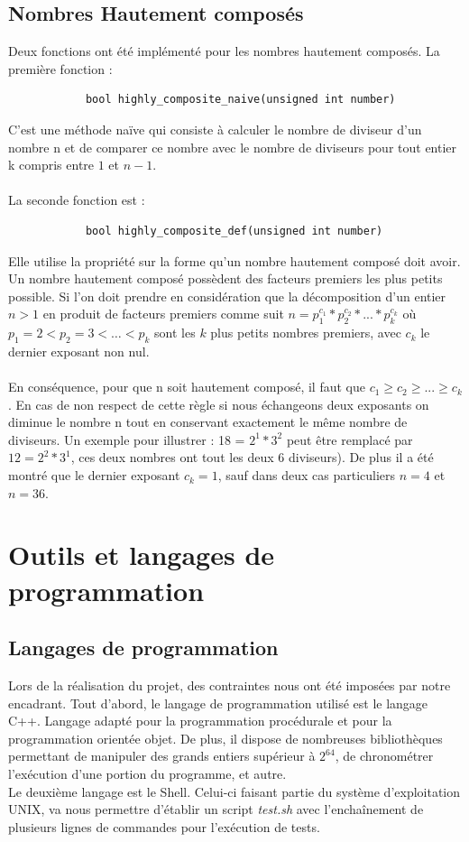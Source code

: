 		\subsection{Nombres Hautement composés}
		Deux fonctions ont été implémenté pour les nombres hautement composés. La première fonction : 				\begin{lstlisting}
			bool highly_composite_naive(unsigned int number)
		\end{lstlisting}
		C'est une méthode naïve qui consiste à calculer le nombre de diviseur d'un nombre n et de comparer ce nombre avec le nombre de diviseurs pour tout entier k compris entre $1$ et $n-1$.
		\paragraph{}La seconde fonction est :
		\begin{lstlisting}
			bool highly_composite_def(unsigned int number)
		\end{lstlisting}
		Elle utilise la propriété sur la forme qu'un nombre hautement composé doit avoir. Un nombre hautement composé possèdent des facteurs premiers les plus petits possible. Si l'on doit prendre en considération que la décomposition d'un entier $n > 1$ en produit de facteurs premiers comme suit  $n = p_1^{c_1} * p_2^{c_2} * ... * p_k^{c_k}$ où $p_1 = 2 < p_2 = 3 < … < p_k$ sont les $k$ plus petits nombres premiers, avec $c_k$ le dernier exposant non nul.
		\paragraph{}En conséquence, pour que n soit hautement composé, il faut que $c_1 \ge c_2 \ge ... \ge c_k$. En cas de non respect de cette règle si nous échangeons deux exposants on diminue le nombre n tout en conservant exactement le même nombre de diviseurs. Un exemple pour illustrer : 18 = $2^1 * 3^2$ peut être remplacé par $12 = 2^2 * 3^1$, ces deux nombres ont tout les deux 6 diviseurs). De plus il a été montré que le dernier exposant $c_k = 1$, sauf dans deux cas particuliers $n = 4$ et $n = 36$.

	\section{Outils et langages de programmation}
		\subsection{Langages de programmation}
		Lors de la réalisation du projet, des contraintes nous ont été imposées par notre encadrant. Tout d'abord, le langage de programmation utilisé est le langage C++. Langage adapté pour la programmation procédurale et pour la programmation orientée objet. De plus, il dispose de nombreuses bibliothèques permettant de manipuler des grands entiers supérieur à $2^{64}$, de chronométrer l'exécution d'une portion du programme, et autre.\\
		Le deuxième langage est le Shell. Celui-ci faisant partie du système d'exploitation UNIX, va nous permettre d'établir un script \textit{test.sh} avec l’enchaînement de plusieurs lignes de commandes pour l'exécution de tests.
		
